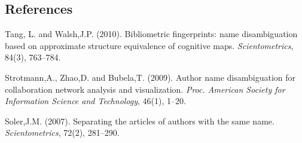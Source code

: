 \documentclass[12pt]{article}
\begin{document}
%        
%
%        

\subsection*{References}

\begin{description}

\item Tang, L. and Walsh,J.P. (2010). Bibliometric fingerprints: name disambiguation based on approximate structure equivalence of cognitive maps. \textit{Scientometrics}, 84(3), 763--784.

\item
Strotmann,A., Zhao,D. and Bubela,T. (2009). Author name disambiguation for collaboration network analysis and visualization. \textit{Proc. American Society for Information Science and Technology}, 46(1), 1--20.

\item
Soler,J.M. (2007). Separating the articles of authors with the same name. \textit{Scientometrics}, 72(2), 281--290.

\end{description}
\end{document}
